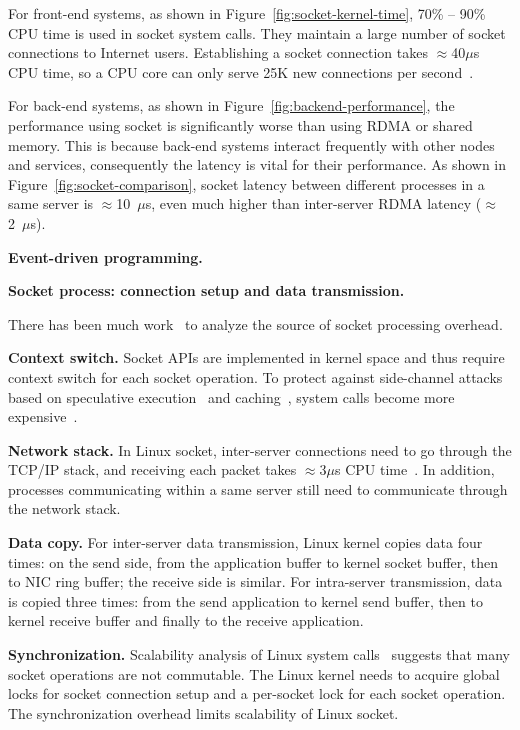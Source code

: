For front-end systems, as shown in Figure~\ref{fig:socket-kernel-time}, 70\% -- 90\% CPU time is used in socket system calls. They maintain a large number of socket connections to Internet users. Establishing a socket connection takes $\approx$40$\mu$s CPU time, so a CPU core can only serve 25K new connections per second~\cite{lin2016scalable}.

For back-end systems, as shown in Figure~\ref{fig:backend-performance}, the performance using socket is significantly worse than using RDMA or shared memory. This is because back-end systems interact frequently with other nodes and services, consequently the latency is vital for their performance. As shown in Figure~\ref{fig:socket-comparison}, socket latency between different processes in a same server is $\approx$10~$\mu$s, even much higher than inter-server RDMA latency ($\approx$2~$\mu$s).

\textbf{Event-driven programming.}

\textbf{Socket process: connection setup and data transmission.}

There has been much work~\cite{peter2016arrakis,lin2016scalable} to analyze the source of socket processing overhead.

\textbf{Context switch.}
Socket APIs are implemented in kernel space and thus require context switch for each socket operation. To protect against side-channel attacks based on speculative execution~\cite{Kocher2018spectre} and caching~\cite{Lipp2018meltdown}, system calls become more expensive~\cite{kpti}.

\textbf{Network stack.}
In Linux socket, inter-server connections need to go through the TCP/IP stack, and receiving each packet takes $\approx$3$\mu$s CPU time~\cite{peter2016arrakis}. In addition, processes communicating within a same server still need to communicate through the network stack.

\textbf{Data copy.}
For inter-server data transmission, Linux kernel copies data four times: on the send side, from the application buffer to kernel socket buffer, then to NIC ring buffer; the receive side is similar.
For intra-server transmission, data is copied three times: from the send application to kernel send buffer, then to kernel receive buffer and finally to the receive application.

\textbf{Synchronization.}
Scalability analysis of Linux system calls~\cite{boyd2010analysis} suggests that many socket operations are not commutable. The Linux kernel needs to acquire global locks for socket connection setup and a per-socket lock for each socket operation. The synchronization overhead limits scalability of Linux socket.


